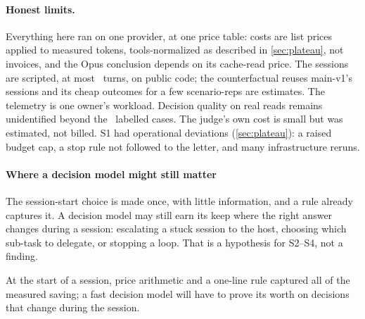 \paragraph{Honest limits.} Everything here ran on one provider, at one price table: costs are list prices applied
to measured tokens, tools-normalized as described in \cref{sec:plateau}, not invoices, and the Opus conclusion depends on its cache-read price. The sessions are scripted,
at most \MaxTurns\ turns, on public code; the counterfactual reuses main-v1's sessions and its cheap outcomes for a
few scenario-reps are estimates. The telemetry is one owner's workload. Decision quality on real reads remains
unidentified beyond the \TrN\ labelled cases. The judge's own cost is small but was estimated, not billed. S1 had
operational deviations (\cref{sec:plateau}): a raised budget cap, a stop rule not followed to the letter, and many
infrastructure reruns.

\paragraph{Where a decision model might still matter} The session-start choice is made once, with little information,
and a rule already captures it. A decision model may still earn its keep where the right answer changes during a
session: escalating a stuck session to the host, choosing which sub-task to delegate, or stopping a loop. That is a
hypothesis for S2--S4, not a finding.

\begin{keyidea}[title={The takeaway}]
At the start of a session, price arithmetic and a one-line rule captured all of the measured saving; a fast decision
model will have to prove its worth on decisions that change during the session.
\end{keyidea}
